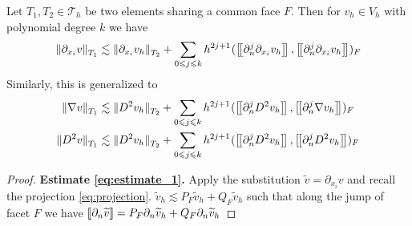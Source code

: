 \begin{lemma}[]
    \label{lemma:bi_local_facet_estimate}
    Let $T_{1},T_{2 } \in  \mathcal{T} _{h}$ be two elements sharing a common face $F$. Then for $v_{h} \in V_{h}$ with polynomial degree $k$ we have
    \begin{equation}
        \label{eq:estimate_1}
        \| \partial _{x_{i}} v \|_{ T_{1} }^{  }  \lesssim \| \partial_{ x_{i} } v_{h} \|_{ T_{2} }^{  } + \sum_{0\leqslant j\leqslant k}  {h^{2j +1}}^{} ( \left[\!\left[  \partial _{n}^{j} \partial _{x_{i}} v_{h}  \right]\!\right], \left[\!\left[  \partial ^{j}_{n} \partial _{x_{i}} v_{h}  \right]\!\right]    )_{F}
    \end{equation}
    Similarly, this is generalized to \begin{equation}
        \begin{split}
        \| \nabla  v \|_{ T_{1} }^{  }  & \lesssim \| D^2 v_{h} \|_{ T_{2} }^{  } + \sum_{0\le j\le k}  {h^{2j +1}}^{} ( \jump{ \partial _{n}^{j} D^2 v_{h} }, \jump{ \partial ^{j}_{n} \nabla  v_{h} }    )_{F} \\
        \| D^2  v \|_{ T_{1} }^{  }  & \lesssim \| D^2 v_{h} \|_{ T_{2} }^{  } + \sum_{0\le j\le k}  {h^{2j +1}}^{} ( \jump{ \partial _{n}^{j} D^2 v_{h} }, \jump{ \partial ^{j}_{n} D^2  v_{h} }    )_{F} \\
        \end{split}
    \end{equation}

\end{lemma}

\begin{proof}
\textbf{Estimate \eqref{eq:estimate_1}.} Apply the substitution $\widetilde{v} = \partial _{x_{i}} v$  and recall the projection \eqref{eq:projection}.
$
     \widetilde{v}_{h}   \lesssim P_{F} \widetilde{v}_{h} + Q_{F} \widetilde{v}_{h}
$
such that along the jump of facet $F$ we have $ \left[\!\left[  \partial _{n} \widetilde{v}  \right]\!\right] = P_{F} \partial _{n} \widetilde{v}_{h} + Q_{F} \partial _{n} \widetilde{v}_{h} $



\end{proof}



